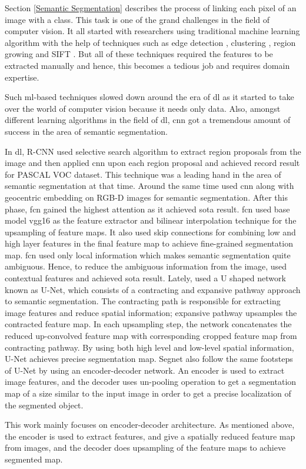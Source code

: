 Section \ref{Semantic Segmentation} describes the process of linking each pixel of an image with a class. This task is one of the grand challenges in the field of computer vision. It all started with researchers using traditional machine learning algorithm \cite{dollar2009integral} with the help of techniques such as edge detection \cite{huang2010image}, clustering \cite{zheng2018image}, region growing \cite{10.1007/978-3-540-76725-1_21} and SIFT \cite{suga2008object}. But all of these techniques required the features to be extracted manually and hence, this becomes a tedious job and requires domain expertise.
\par
Such \ac{ml}-based techniques slowed down around the era of \ac{dl} as it started to take over the world of computer vision because it needs only data. Also, amongst different learning algorithms in the field of \ac{dl}, \ac{cnn} got a tremendous amount of success in the area of semantic segmentation. 
\par
In \ac{dl}, R-CNN \cite{girshick2014rich} used selective search algorithm \cite{uijlings2013selective} to extract region proposals from the image and then applied \ac{cnn} upon each region proposal and achieved record result for PASCAL VOC dataset. This technique was a leading hand in the area of semantic segmentation at that time. Around the same time \cite{DBLP:journals/corr/GuptaGAM14} used \ac{cnn} along with geocentric embedding on RGB-D images for semantic segmentation. After this phase, \ac{fcn} \cite{long2015fully} gained the highest attention as it achieved \ac{sota} result. \ac{fcn} used base model \ac{vgg}16 as the feature extractor and bilinear interpolation technique for the upsampling of feature maps. It also used skip connections for combining low and high layer features in the final feature map to achieve fine-grained segmentation map. \ac{fcn} used only local information which makes semantic segmentation quite ambiguous. Hence, to reduce the ambiguous information from the image, \cite{DBLP:journals/corr/MostajabiYS14} used contextual features and achieved \ac{sota} result. Lately, \cite{DBLP:journals/corr/RonnebergerFB15} used a U shaped network known as U-Net, which consists of a contracting and expansive pathway approach to semantic segmentation. The contracting path is responsible for extracting image features and reduce spatial information; expansive pathway upsamples the contracted feature map. In each upsampling step, the network concatenates the reduced up-convolved feature map with corresponding cropped feature map from contracting pathway. By using both high level and low-level spatial information, U-Net achieves precise segmentation map. Segnet \cite{DBLP:journals/corr/BadrinarayananK15} also follow the same footsteps of U-Net by using an encoder-decoder network. An encoder is used to extract image features, and the decoder uses un-pooling operation to get a segmentation map of a size similar to the input image in order to get a precise localization of the segmented object. 
\par
This work mainly focuses on encoder-decoder architecture. As mentioned above, the encoder is used to extract features, and give a spatially reduced feature map from images, and the decoder does upsampling of the feature maps to achieve segmented map. 
\clearpage

